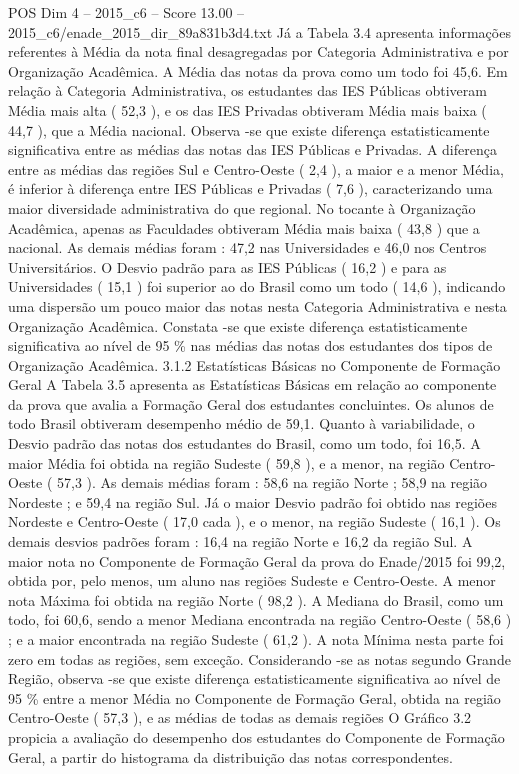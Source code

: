 \begin{textsample}{POS Dim 4 – 2015\_c6 – Score 13.00 – 2015\_c6/enade\_2015\_dir\_89a831b3d4.txt}
Já a Tabela 3.4 apresenta informações referentes à Média da nota final desagregadas por Categoria Administrativa e por Organização Acadêmica.
A Média das notas da prova como um todo foi 45,6.
Em relação à Categoria Administrativa, os estudantes das IES Públicas obtiveram Média mais alta ( 52,3 ), e os das IES Privadas obtiveram Média mais baixa ( 44,7 ), que a Média nacional.
Observa -se que existe diferença estatisticamente significativa entre as médias das notas das IES Públicas e Privadas.
A diferença entre as médias das regiões Sul e Centro-Oeste ( 2,4 ), a maior e a menor Média, é inferior à diferença entre IES Públicas e Privadas ( 7,6 ), caracterizando uma maior diversidade administrativa do que regional.
No tocante à Organização Acadêmica, apenas as Faculdades obtiveram Média mais baixa ( 43,8 ) que a nacional.
As demais médias foram : 47,2 nas Universidades e 46,0 nos Centros Universitários.
O Desvio padrão para as IES Públicas ( 16,2 ) e para as Universidades ( 15,1 ) foi superior ao do Brasil como um todo ( 14,6 ), indicando uma dispersão um pouco maior das notas nesta Categoria Administrativa e nesta Organização Acadêmica.
Constata -se que existe diferença estatisticamente significativa ao nível de 95 \% nas médias das notas dos estudantes dos tipos de Organização Acadêmica. 3.1.2 Estatísticas Básicas no Componente de Formação Geral A Tabela 3.5 apresenta as Estatísticas Básicas em relação ao componente da prova que avalia a Formação Geral dos estudantes concluintes.
Os alunos de todo Brasil obtiveram desempenho médio de 59,1.
Quanto à variabilidade, o Desvio padrão das notas dos estudantes do Brasil, como um todo, foi 16,5.
A maior Média foi obtida na região Sudeste ( 59,8 ), e a menor, na região Centro-Oeste ( 57,3 ).
As demais médias foram : 58,6 na região Norte ; 58,9 na região Nordeste ; e 59,4 na região Sul.
Já o maior Desvio padrão foi obtido nas regiões Nordeste e Centro-Oeste ( 17,0 cada ), e o menor, na região Sudeste ( 16,1 ).
Os demais desvios padrões foram : 16,4 na região Norte e 16,2 da região Sul.
A maior nota no Componente de Formação Geral da prova do Enade/2015 foi 99,2, obtida por, pelo menos, um aluno nas regiões Sudeste e Centro-Oeste.
A menor nota Máxima foi obtida na região Norte ( 98,2 ).
A Mediana do Brasil, como um todo, foi 60,6, sendo a menor Mediana encontrada na região Centro-Oeste ( 58,6 ) ; e a maior encontrada na região Sudeste ( 61,2 ).
A nota Mínima nesta parte foi zero em todas as regiões, sem exceção.
Considerando -se as notas segundo Grande Região, observa -se que existe diferença estatisticamente significativa ao nível de 95 \% entre a menor Média no Componente de Formação Geral, obtida na região Centro-Oeste ( 57,3 ), e as médias de todas as demais regiões O Gráfico 3.2 propicia a avaliação do desempenho dos estudantes do Componente de Formação Geral, a partir do histograma da distribuição das notas correspondentes.

\end{textsample}
